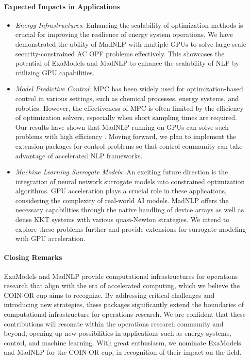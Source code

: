 \paragraph{Expected Impacts in Applications}

\begin{itemize}
\item \textit{Energy Infrastructures}: Enhancing the scalability of
optimization methods is crucial for improving the resilience of energy
system operations. We have demonstrated the ability of MadNLP with
multiple GPUs to solve large-scale security-constrained AC OPF
problems effectively. This showcases the potential of ExaModels and
MadNLP to enhance the scalability of NLP by utilizing GPU
capabilities.

\item \textit{Model Predictive Control}: MPC has been widely used for
optimization-based control in various settings, such as chemical
processes, energy systems, and robotics. However, the effectiveness of
MPC is often limited by the efficiency of optimization solvers,
especially when short sampling times are required. Our results have
shown that MadNLP running on GPUs can solve such problems with high
efficiency \cite{}. Moving forward, we plan to implement the extension
packages for control problems so that control community can take
advantage of accelerated NLP frameworks.

\item \textit{Machine Learning Surrogate Models}: An exciting future
direction is the integration of neural network surrogate models into
constrained optimization algorithms. GPU acceleration plays a crucial
role in these applications, considering the complexity of real-world
AI models. MadNLP offers the necessary capabilities through the native
handling of device arrays as well as dense KKT systems with various
quasi-Newton strategies. We intend to explore these problems further
and provide extensions for surrogate modeling with GPU acceleration.

\end{itemize}

\paragraph{Closing Remarks} ExaModels and MadNLP provide computational
infrastructures for operations research that align with the era of
accelerated computing, which we believe the COIN-OR cup aims to
recognize. By addressing critical challenges and introducing new
strategies, these packages significantly extend the boundaries of
computational infrastructure for operations research. We are confident
that these contributions will resonate within the operations research
community and beyond, opening up new possibilities in applications
such as energy systems, control, and machine learning. With great
enthusiasm, we nominate ExaModels and MadNLP for the COIN-OR cup, in
recognition of their impact on the field.


